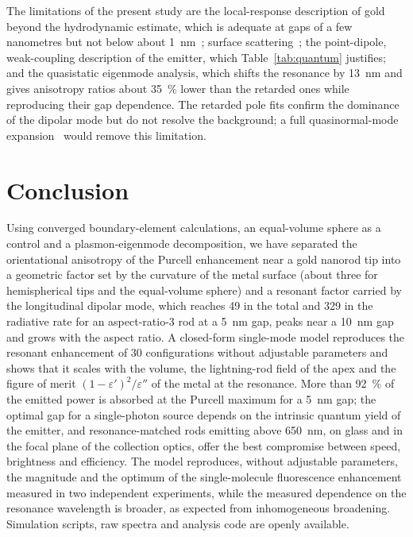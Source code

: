 \documentclass[11pt,a4paper]{article}
\begin{document}
The limitations of the present study are the local-response description of gold beyond the hydrodynamic estimate,
which is adequate at gaps of a few nanometres but not below about \SI{1}{nm}~\cite{xu,ciraci,zhu2016}; surface
scattering~\cite{kreibig,coronado}; the point-dipole, weak-coupling description of the emitter, which
Table~\ref{tab:quantum} justifies; and the quasistatic eigenmode analysis, which shifts the resonance by \SI{13}{nm}
and gives anisotropy ratios about \SI{35}{\percent} lower than the retarded ones while reproducing their gap
dependence. The retarded pole fits confirm the dominance of the dipolar mode but do not resolve the background; a full
quasinormal-mode expansion~\cite{sauvan,lalanne} would remove this limitation.

\section{Conclusion}
Using converged boundary-element calculations, an equal-volume sphere as a control and a plasmon-eigenmode
decomposition, we have separated the orientational anisotropy of the Purcell enhancement near a gold nanorod tip
into a geometric factor set by the curvature of the metal surface (about three for hemispherical tips and the
equal-volume sphere) and a resonant factor carried by the
longitudinal dipolar mode, which reaches 49 in the total and 329 in the radiative rate for an aspect-ratio-3 rod at a
\SI{5}{nm} gap, peaks near a \SI{10}{nm} gap and grows with the aspect ratio. A closed-form single-mode model
reproduces the resonant enhancement of 30 configurations without adjustable parameters and shows that it scales with the
volume, the lightning-rod field of the apex and the figure of merit $(1-\varepsilon')^2/\varepsilon''$ of the metal
at the resonance. More than \SI{92}{\percent} of the
emitted power is absorbed at the Purcell maximum for a \SI{5}{nm} gap; the optimal gap for a single-photon source
depends on the intrinsic quantum yield of the emitter, and resonance-matched rods emitting above \SI{650}{nm}, on
glass and in the focal plane of the collection optics, offer the best compromise between speed, brightness and
efficiency. The model reproduces, without adjustable parameters, the magnitude and the optimum of the
single-molecule fluorescence enhancement measured in two independent experiments, while the measured dependence on
the resonance wavelength is broader, as expected from inhomogeneous broadening. Simulation scripts, raw spectra and analysis code are openly available.
\end{document}

